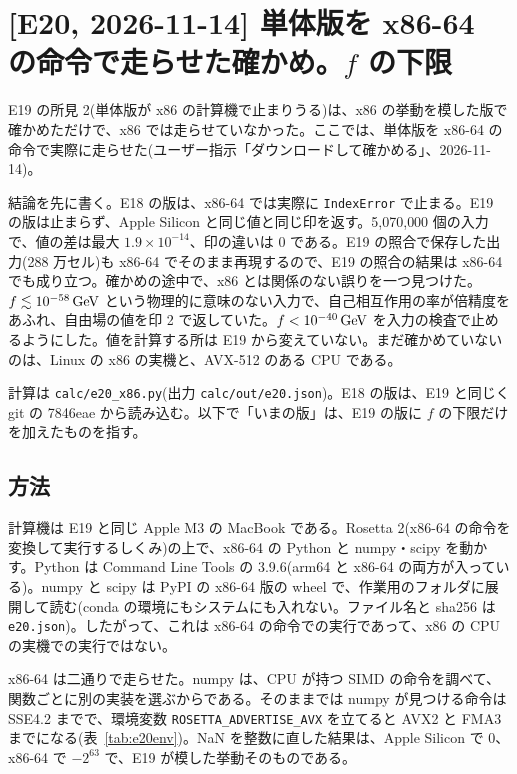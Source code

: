 \section{[E20, 2026-11-14] 単体版を x86-64 の命令で走らせた確かめ。$f$ の下限}\label{sec:e20}

E19 の所見 2(単体版が x86 の計算機で止まりうる)は、x86 の挙動を模した版で確かめただけで、x86 では走らせていなかった。ここでは、単体版を x86-64 の命令で実際に走らせた(ユーザー指示「ダウンロードして確かめる」、2026-11-14)。

結論を先に書く。E18 の版は、x86-64 では実際に \texttt{IndexError} で止まる。E19 の版は止まらず、Apple Silicon と同じ値と同じ印を返す。5{,}070{,}000 個の入力で、値の差は最大 $1.9\times10^{-14}$、印の違いは 0 である。E19 の照合で保存した出力(288 万セル)も x86-64 でそのまま再現するので、E19 の照合の結果は x86-64 でも成り立つ。確かめの途中で、x86 とは関係のない誤りを一つ見つけた。$f\lesssim10^{-58}\,\mathrm{GeV}$ という物理的に意味のない入力で、自己相互作用の率が倍精度をあふれ、自由場の値を印 2 で返していた。$f<10^{-40}\,\mathrm{GeV}$ を入力の検査で止めるようにした。値を計算する所は E19 から変えていない。まだ確かめていないのは、Linux の x86 の実機と、AVX-512 のある CPU である。

計算は \texttt{calc/e20\_x86.py}(出力 \texttt{calc/out/e20.json})。E18 の版は、E19 と同じく git の 7846eae から読み込む。以下で「いまの版」は、E19 の版に $f$ の下限だけを加えたものを指す。

\subsection{方法}

計算機は E19 と同じ Apple M3 の MacBook である。Rosetta 2(x86-64 の命令を変換して実行するしくみ)の上で、x86-64 の Python と numpy・scipy を動かす。Python は Command Line Tools の 3.9.6(arm64 と x86-64 の両方が入っている)。numpy と scipy は PyPI の x86-64 版の wheel で、作業用のフォルダに展開して読む(conda の環境にもシステムにも入れない。ファイル名と sha256 は \texttt{e20.json})。したがって、これは x86-64 の命令での実行であって、x86 の CPU の実機での実行ではない。

x86-64 は二通りで走らせた。numpy は、CPU が持つ SIMD の命令を調べて、関数ごとに別の実装を選ぶからである。そのままでは numpy が見つける命令は SSE4.2 までで、環境変数 \texttt{ROSETTA\_ADVERTISE\_AVX} を立てると AVX2 と FMA3 までになる(表~\ref{tab:e20env})。NaN を整数に直した結果は、Apple Silicon で 0、x86-64 で $-2^{63}$ で、E19 が模した挙動そのものである。

